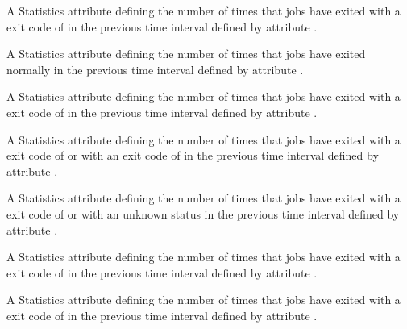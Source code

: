\begin{description}
\item[\AdAttr{RecentJobsExecFailed}:] A Statistics attribute defining
  the number of times that jobs have exited 
  with a  exit code of  
  in the previous time interval defined by attribute .

\item[\AdAttr{RecentJobsExited}:] A Statistics attribute defining
  the number of times that jobs have exited normally
  in the previous time interval defined by attribute .

\item[\AdAttr{RecentJobsExitedAndClaimClosing}:] A Statistics attribute defining
  the number of times that jobs 
  have exited with a  exit code of 
  in the previous time interval defined by attribute .

\item[\AdAttr{RecentJobsExitedNormally}:] A Statistics attribute defining
  the number of times that jobs have exited 
  with a  exit code of  or with an
  exit code of 
  in the previous time interval defined by attribute .

\item[\AdAttr{RecentJobsExitException}:] A Statistics attribute defining
  the number of times that jobs 
  have exited with a  exit code of 
  or with an unknown status
  in the previous time interval defined by attribute .

\item[\AdAttr{RecentJobsKilled}:] A Statistics attribute defining
  the number of times that jobs 
  have exited with a  exit code of 
  in the previous time interval defined by attribute .

\item[\AdAttr{RecentJobsMissedDeferralTime}:] A Statistics attribute defining
  the number of times that jobs 
  have exited with a  exit code of 
  in the previous time interval defined by attribute .


\end{description}
